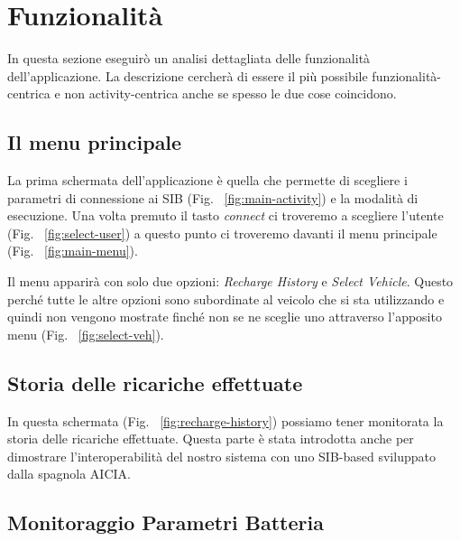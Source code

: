\section{Funzionalità}

In questa sezione eseguirò un analisi dettagliata delle funzionalità dell'applicazione. La descrizione cercherà di essere il più possibile funzionalità-centrica e non activity-centrica anche se spesso le due cose coincidono. 


\subsection{Il menu principale}

La prima schermata dell'applicazione è quella che permette di scegliere i parametri di connessione ai SIB (Fig. ~\ref{fig:main-activity})  e la modalità di esecuzione. Una volta premuto il tasto \emph{connect} ci troveremo a scegliere l'utente (Fig. ~\ref{fig:select-user}) a questo punto ci troveremo davanti il menu principale (Fig. ~\ref{fig:main-menu}).

Il menu apparirà con solo due opzioni: \emph{Recharge History} e \emph{Select Vehicle}. Questo perché tutte le altre opzioni sono subordinate al veicolo che si sta utilizzando e quindi non vengono mostrate finché non se ne sceglie uno attraverso l'apposito menu (Fig. ~\ref{fig:select-veh}). 

\subsection{Storia delle ricariche effettuate}

In questa schermata (Fig. ~\ref{fig:recharge-history}) possiamo tener monitorata la storia delle ricariche effettuate. Questa parte è stata introdotta anche per dimostrare l'interoperabilità del nostro sistema con uno SIB-based sviluppato dalla spagnola AICIA.

\subsection{Monitoraggio Parametri Batteria}

